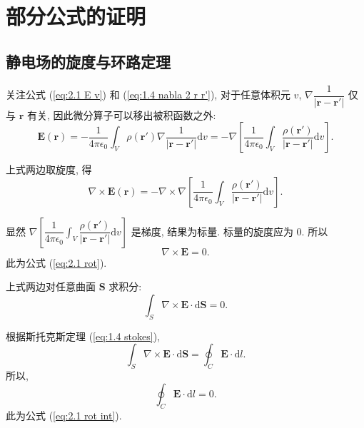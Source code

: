 \section{部分公式的证明}
\subsection{静电场的旋度与环路定理}
关注公式 (\ref{eq:2.1 E v}) 和 (\ref{eq:1.4 nabla 2 r r'}), 对于任意体积元 $v$, $\nabla\dfrac{1}{|\bm{r}-\bm{r'}|}$ 仅与 $\bm{r}$ 有关, 因此微分算子可以移出被积函数之外:
\begin{equation}
    \bm{E}(\bm{r})=-\frac{1}{4\pi\epsilon_0}\int_V\rho(\bm{r'})\nabla\frac{1}{|\bm{r}-\bm{r'}|}\mathrm{d}v=-\nabla\left[\frac{1}{4\pi\epsilon_0}\int_V\frac{\rho(\bm{r'})}{|\bm{r}-\bm{r'}|}\mathrm{d}v\right].
\end{equation}

上式两边取旋度, 得
\begin{equation}
    \nabla\times\bm{E}(\bm{r})=-\nabla\times\nabla\left[\frac{1}{4\pi\epsilon_0}\int_V\frac{\rho(\bm{r'})}{|\bm{r}-\bm{r'}|}\mathrm{d}v\right].
\end{equation}

显然 $\nabla\left[\dfrac{1}{4\pi\epsilon_0}\displaystyle\int_V\dfrac{\rho(\bm{r'})}{|\bm{r}-\bm{r'}|}\mathrm{d}v\right]$ 是梯度, 结果为标量. 标量的旋度应为 0. 所以
\begin{equation}
    \nabla\times\bm{E}=0.
\end{equation}
此为公式 (\ref{eq:2.1 rot}).

上式两边对任意曲面 $\bm{S}$ 求积分:
\begin{equation}
    \int_S\nabla\times\bm{E}\cdot\mathrm{d}\bm{S}=0.
\end{equation}

根据斯托克斯定理 (\ref{eq:1.4 stokes}),
\begin{equation}
    \int_S\nabla\times\bm{E}\cdot\mathrm{d}\bm{S}=\oint_C\bm{E}\cdot\mathrm{d}l.
\end{equation}
所以,
\begin{equation}
    \oint_C\bm{E}\cdot\mathrm{d}l=0.
\end{equation}
此为公式 (\ref{eq:2.1 rot int}).

